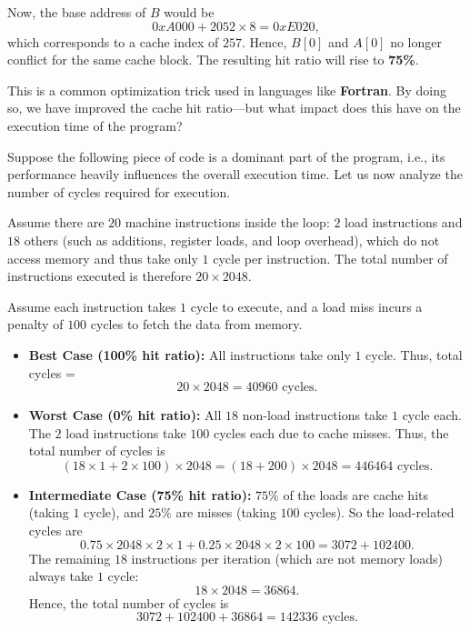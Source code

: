 \documentclass[12pt]{book}
\begin{document}
Now, the base address of $B$ would be
\[
0xA000 + 2052 \times 8 = 0xE020,
\]
which corresponds to a cache index of $257$. Hence, $B[0]$ and $A[0]$ no longer conflict for the same cache block. The resulting hit ratio will rise to \textbf{75\%}. 

This is a common optimization trick used in languages like \textbf{Fortran}. By doing so, we have improved the cache hit ratio—but what impact does this have on the execution time of the program?

Suppose the following piece of code is a dominant part of the program, i.e., its performance heavily influences the overall execution time. Let us now analyze the number of cycles required for execution.

Assume there are $20$ machine instructions inside the loop: $2$ load instructions and $18$ others (such as additions, register loads, and loop overhead), which do not access memory and thus take only $1$ cycle per instruction. The total number of instructions executed is therefore $20 \times 2048$.

Assume each instruction takes $1$ cycle to execute, and a load miss incurs a penalty of $100$ cycles to fetch the data from memory.

\begin{itemize}
    \item \textbf{Best Case (100\% hit ratio):}  
    All instructions take only $1$ cycle. Thus, total cycles =  
    \[
    20 \times 2048 = 40960 \text{ cycles}.
    \]
    
    \item \textbf{Worst Case (0\% hit ratio):}  
    All $18$ non-load instructions take $1$ cycle each. The $2$ load instructions take $100$ cycles each due to cache misses. Thus, the total number of cycles is  
    \[
    (18 \times 1 + 2 \times 100) \times 2048 = (18 + 200) \times 2048 = 446464 \text{ cycles}.
    \]
    
    \item \textbf{Intermediate Case (75\% hit ratio):}  
    $75\%$ of the loads are cache hits (taking $1$ cycle), and $25\%$ are misses (taking $100$ cycles). So the load-related cycles are  
    \[
    0.75 \times 2048 \times 2 \times 1 + 0.25 \times 2048 \times 2 \times 100 = 3072 + 102400.
    \]
    The remaining $18$ instructions per iteration (which are not memory loads) always take $1$ cycle:  
    \[
    18 \times 2048 = 36864.
    \]
    Hence, the total number of cycles is  
    \[
    3072 + 102400 + 36864 = 142336 \text{ cycles}.
    \]
\end{itemize}
\end{document}
